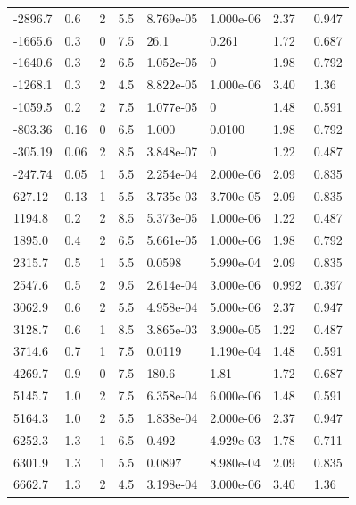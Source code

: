 \documentclass[preview]{standalone}
\begin{document}
{{\begin{tabular}{L{1.2cm}C{1.2cm} C{0.3cm}C{0.5cm} C{1.4cm}C{1.4cm} C{1.4cm}C{1.4cm}}
  -2896.7  &   0.6  & 2     & 5.5 &  8.769e-05  & 1.000e-06  & 2.37 &  0.947   \\ 
  -1665.6  &   0.3  & 0     & 7.5 &  26.1  & 0.261  & 1.72 &  0.687   \\ 
  -1640.6  &   0.3  & 2     & 6.5 &  1.052e-05  & 0  & 1.98 &  0.792   \\ 
  -1268.1  &   0.3  & 2     & 4.5 &  8.822e-05  & 1.000e-06  & 3.40 &  1.36   \\ 
  -1059.5  &   0.2  & 2     & 7.5 &  1.077e-05  & 0  & 1.48 &  0.591   \\ 
  -803.36  &  0.16  & 0     & 6.5 &  1.000  & 0.0100  & 1.98 &  0.792   \\ 
  -305.19  &  0.06  & 2     & 8.5 &  3.848e-07  & 0  & 1.22 &  0.487   \\ 
  -247.74  &  0.05  & 1     & 5.5 &  2.254e-04  & 2.000e-06  & 2.09 &  0.835   \\ 
  627.12  &  0.13  & 1     & 5.5 &  3.735e-03  & 3.700e-05  & 2.09 &  0.835   \\ 
  1194.8  &   0.2  & 2     & 8.5 &  5.373e-05  & 1.000e-06  & 1.22 &  0.487   \\ 
  1895.0  &   0.4  & 2     & 6.5 &  5.661e-05  & 1.000e-06  & 1.98 &  0.792   \\ 
  2315.7  &   0.5  & 1     & 5.5 &  0.0598  & 5.990e-04  & 2.09 &  0.835   \\ 
  2547.6  &   0.5  & 2     & 9.5 &  2.614e-04  & 3.000e-06  & 0.992 &  0.397   \\ 
  3062.9  &   0.6  & 2     & 5.5 &  4.958e-04  & 5.000e-06  & 2.37 &  0.947   \\ 
  3128.7  &   0.6  & 1     & 8.5 &  3.865e-03  & 3.900e-05  & 1.22 &  0.487   \\ 
  3714.6  &   0.7  & 1     & 7.5 &  0.0119  & 1.190e-04  & 1.48 &  0.591   \\ 
  4269.7  &   0.9  & 0     & 7.5 &  180.6  & 1.81  & 1.72 &  0.687   \\ 
  5145.7  &   1.0  & 2     & 7.5 &  6.358e-04  & 6.000e-06  & 1.48 &  0.591   \\ 
  5164.3  &   1.0  & 2     & 5.5 &  1.838e-04  & 2.000e-06  & 2.37 &  0.947   \\ 
  6252.3  &   1.3  & 1     & 6.5 &  0.492  & 4.929e-03  & 1.78 &  0.711   \\ 
  6301.9  &   1.3  & 1     & 5.5 &  0.0897  & 8.980e-04  & 2.09 &  0.835   \\ 
  6662.7  &   1.3  & 2     & 4.5 &  3.198e-04  & 3.000e-06  & 3.40 &  1.36   \\ 

\end{tabular}}}
\end{document}
